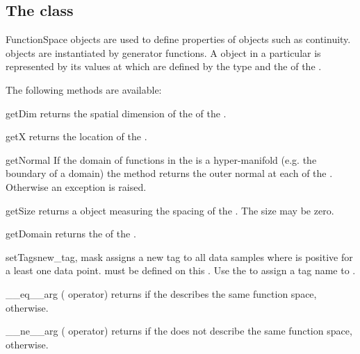 \subsection{The \FunctionSpace class}
\begin{classdesc}{FunctionSpace}{}
\FunctionSpace objects are used to define properties of \Data objects such as continuity.
\FunctionSpace objects are instantiated by generator functions.
A \Data object in a particular \FunctionSpace is represented by its values at
\DataSamplePoints which are defined by the type and the \Domain of the \FunctionSpace.
\end{classdesc}
%
The following methods are available:
%
\begin{methoddesc}[FunctionSpace]{getDim}{}
    returns the spatial dimension of the \Domain of the \FunctionSpace.
\end{methoddesc}
%
\begin{methoddesc}[FunctionSpace]{getX}{}
    returns the location of the \DataSamplePoints.
\end{methoddesc}
%
\begin{methoddesc}[FunctionSpace]{getNormal}{}
    If the domain of functions in the \FunctionSpace is a hyper-manifold (e.g.
    the boundary of a domain) the method returns the outer normal at each of
    the \DataSamplePoints. Otherwise an exception is raised.
\end{methoddesc}
%
\begin{methoddesc}[FunctionSpace]{getSize}{}
    returns a \Data object measuring the spacing of the \DataSamplePoints.
    The size may be zero.
\end{methoddesc}
%
\begin{methoddesc}[FunctionSpace]{getDomain}{}
    returns the \Domain of the \FunctionSpace.
\end{methoddesc}
%
\begin{methoddesc}[FunctionSpace]{setTags}{new_tag, mask}
    assigns a new tag  to all data samples where  is
    positive for a least one data point.
     must be defined on this \FunctionSpace.
    Use the  to assign a tag name to .
\end{methoddesc}
%
\begin{methoddesc}[FunctionSpace]{__eq__}{arg}
    (\PYTHON \var{==} operator) returns \True if the \FunctionSpace {}
    describes the same function space, \False otherwise.
\end{methoddesc}
%
\begin{methoddesc}[FunctionSpace]{__ne__}{arg}
    (\PYTHON \var{!=} operator) returns \True if the \FunctionSpace {}
    does not describe the same function space, \False otherwise.
\end{methoddesc}

